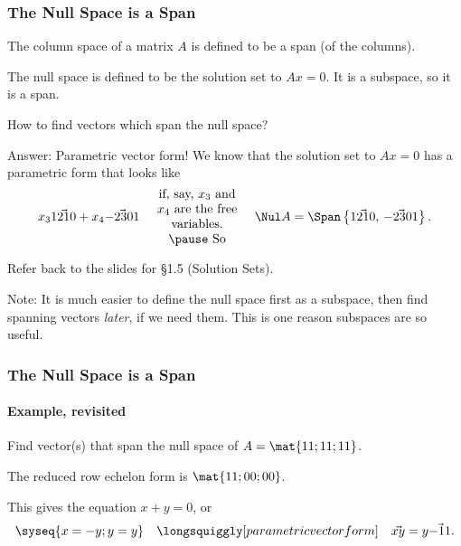 \begin{frame}
\frametitle{The Null Space is a Span}

The column space of a matrix $A$ is defined to be a span (of the columns).

\pause\medskip
The null space is defined to be the solution set to $Ax=0$.
\pause
It is a subspace, so it is a span.

\pause
\begin{ques}
  How to find vectors which span the null space?
\end{ques}

\pause
\alert{Answer:} Parametric vector form!
\pause
We know that the solution set to $Ax=0$ has a parametric form that looks like
\[ x_3\vec{1 2 1 0} + x_4\vec{-2 3 0 1}\quad
\parbox{2.5cm}{\centering if, say, $x_3$ and $x_4$ are the free variables. \pause So}
\quad
\Nul A = \Span\left\{ \vec{1 2 1 0},\, \vec{-2 3 0 1} \right\}.
\]

\pause\medskip
Refer back to the slides for \S1.5 (Solution Sets).

\pause\medskip
\alert{Note:} It is much easier to define the null space first as a
subspace, then find spanning vectors \emph{later}, if we need them.  This is one
reason subspaces are so useful.

\end{frame}



\begin{frame}
\frametitle{The Null Space is a Span}
\framesubtitle{Example, revisited}

Find vector(s) that span the null space of $A = \mat{1 1; 1 1; 1 1}$.

\begin{webonly}
\medskip
The reduced row echelon form is
$\mat{1 1; 0 0; 0 0}$.

\medskip
This gives the equation $x + y = 0$, or
\[ \syseq{x = -y; y = y}
\quad\longsquiggly[parametric vector form]\quad
\vec{x y} = y\vec{-1 1}. \]
\end{webonly}

\begin{minipage}[t]{.6\linewidth}
\end{minipage}\pause
{}

\end{frame}


